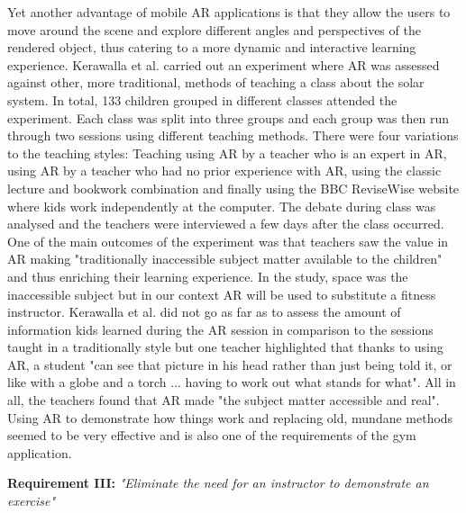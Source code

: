 \documentclass{l4proj}
\begin{document}
Yet another advantage of mobile AR applications is that they allow the users to move around the scene and explore different angles and perspectives of the rendered object, thus catering to a more dynamic and interactive learning experience\cite{fitzgerald_augmented_2013}\cite{dede_immersive_2009}. Kerawalla et al. carried out an experiment where AR was assessed against other, more traditional, methods of teaching a class about the solar system\cite{kerawalla_making_2006}. In total, 133 children grouped in different classes attended the experiment. Each class was split into three groups and each group was then run through two sessions using different teaching methods. There were four variations to the teaching styles: Teaching using AR by a teacher who is an expert in AR, using AR by a teacher who had no prior experience with AR, using the classic lecture and bookwork combination and finally using the BBC ReviseWise website where kids work independently at the computer. The debate during class was analysed and the teachers were interviewed a few days after the class occurred. One of the main outcomes of the experiment was that teachers saw the value in AR making "traditionally inaccessible subject matter available to the children"\cite{kerawalla_making_2006} and thus enriching their learning experience. In the study, space was the inaccessible subject but in our context AR will be used to substitute a fitness instructor. Kerawalla et al. did not go as far as to assess the amount of information kids learned during the AR session in comparison to the sessions taught in a traditionally style but one teacher highlighted that thanks to using AR, a student "can see that picture in his head rather than just being told it, or like with a globe and a torch ... having to work out what stands for what"\cite{kerawalla_making_2006}. All in all, the teachers found that AR made "the  subject  matter  accessible  and real". Using AR to demonstrate how things work and replacing old, mundane methods seemed to be very effective and is also one of the requirements of the gym application.  

\textbf{Requirement III:} \textit{"Eliminate the need for an instructor to demonstrate an exercise"}
\end{document}
